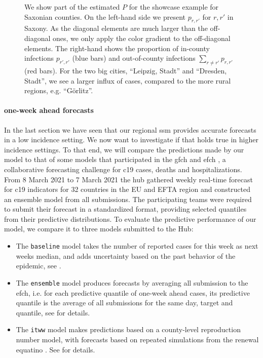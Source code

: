 \begin{figure}
    \resizebox{\textwidth}{!}{%
    }
    \caption{We show part of the estimated $P$ for the showcase example for Saxonian counties. On the left-hand side we present $p_{r,r'}$ for $r,r'$ in Saxony. As the diagonal elements are much larger than the off-diagonal ones, we only apply the color gradient to the off-diagonal elements. The right-hand shows the proportion of in-county infections $p_{r',r'}$ (blue bars) and out-of-county infections $\sum_{r \neq r'} p_{r,r'}$ (red bars). For the two big cities, ``Leipzig, Stadt'' and ``Dresden, Stadt'', we see a larger influx of cases, compared to the more rural regions, e.g. ``Görlitz''.} 
    \label{fig:P_matrix_saxony.tex}
\end{figure}


\paragraph{one-week ahead forecasts}

In the last section we have seen that our regional \acrshort{ssm} provides accurate forecasts in a low incidence setting. We now want to investigate if that holds true in higher incidence settings.
To that end, we will compare the predictions made by our model to that of some models that participated in the \acrlong{gfch} \citep{Bracher2021Preregistered,Bracher2022National} and \acrlong{efch} \citep{Sherratt2023Predictive}, a collaborative forecasting challenge for \acrshort{c19} cases, deaths and hospitalizations. From 8 March 2021 to 7 March 2021 the hub gathered weekly real-time forecast for \acrshort{c19} indicators for 32 countries in the EU and EFTA region and constructed an ensemble model from all submissions. The participating teams were required to submit their forecast in a standardized format, providing selected quantiles from their predictive distributions. To evaluate the predictive performance of our model, we compare it to three models submitted to the Hub:

\begin{itemize}
    \item The \texttt{baseline} model takes the number of reported cases for this week as next weeks median, and adds uncertainty based on the past behavior of the epidemic, see \citep{Cramer2021Evaluation}.
    \item The \texttt{ensemble} model produces forecasts by averaging all submission to the \acrlong{efch}, i.e. for each predictive quantile of one-week ahead cases, its predictive quantile is the average of all submissions for the same day, target and quantile, see \citep{Sherratt2023Predictive} for details.
    \item The \texttt{itww} model makes predictions based on a county-level reproduction number model, with forecasts based on repeated simulations from the renewal equatino . See \citep{Heyder2022Regional} for details.
\end{itemize}

